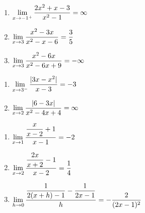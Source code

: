 \begin{enumerate}
\setcounter{enumi}{\value{HW}}

\item   $\displaystyle{\lim_{x \rightarrow -1^{+}} \dfrac{2x^2+x-3}{x^2-1} = \infty}$

\medskip

\item  $\displaystyle{\lim_{x \rightarrow 3} \dfrac{x^2-3x}{x^2-x-6} = \frac{3}{5}}$


\medskip

\item  $\displaystyle{\lim_{x \rightarrow 3} \dfrac{x^2-6x}{x^2-6x+9} = -\infty}$

\medskip

\setcounter{HW}{\value{enumi}}
\end{enumerate}




\begin{enumerate}
\setcounter{enumi}{\value{HW}}

\item  $\displaystyle{ \lim_{x \rightarrow 3^{-}} \dfrac{|3x - x^2| }{x-3} = -3}$ 

\medskip    

\item $\displaystyle{\lim_{x \rightarrow 2} \dfrac{|6-3x|}{x^2-4x+4} = \infty}$

\medskip

\setcounter{HW}{\value{enumi}}
\end{enumerate}

\begin{enumerate}
\setcounter{enumi}{\value{HW}}

\item  $\displaystyle{\lim_{x \rightarrow 1} \dfrac{\dfrac{x}{x-2} +1}{x-1} = -2}$

\medskip

\item $\displaystyle{ \lim_{x \rightarrow 2} \dfrac{\dfrac{2x}{x+2}  -1}{x-2}  = \frac{1}{4}}$ 

\medskip
     
\item $\displaystyle{ \lim_{h \rightarrow 0} \dfrac{\dfrac{1}{2(x+h) - 1}  - \dfrac{1}{2x-1} }{h} = -\frac{2}{(2x-1)^2} }$ 

\medskip

\setcounter{HW}{\value{enumi}}
\end{enumerate}

